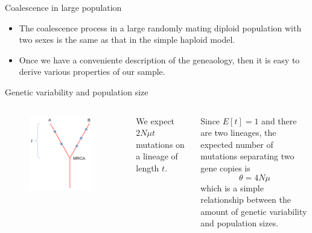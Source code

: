 \begin{frame}{Coalescence in large population}

        \begin{itemize}
		\item The coalescence process in a large randomly mating diploid population with two sexes is the same as that
		in the simple haploid model.
		\item Once we have a conveniente description of the geneaology, then it is easy to derive various properties
		of our sample.
	\end{itemize}

\end{frame}


\begin{frame}{Genetic variability and population size}

	\begin{columns}


                \begin{figure}
                        \includegraphics[width=0.9\textwidth]{Pics/tau}
                \end{figure}

          

		We expect $2N\mu t$ mutations on a lineage of length $t$. 

		Since $E[t]=1$ and there are two lineages,
		the expected number of mutations separating two gene copies is
		\begin{equation}
			\theta = 4N\mu
		\end{equation}
		which is a simple relationship between the amount of genetic variability and population sizes.

        \end{columns}

\end{frame}



